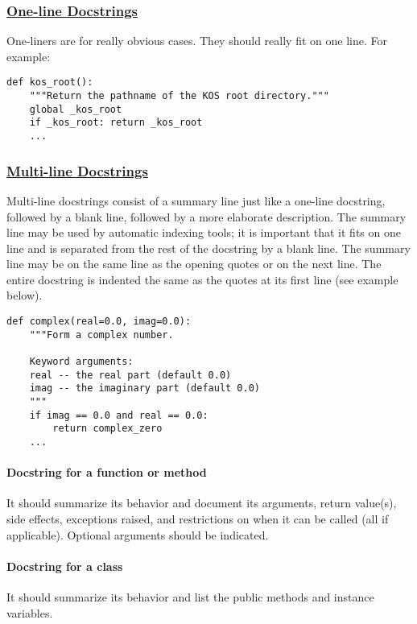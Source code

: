 \documentclass[a4paper]{report}
\begin{document}
\subsubsection{\href{https://www.python.org/dev/peps/pep-0257/\#one-line-docstrings}{One-line Docstrings}}
One-liners are for really obvious cases. They should really fit on one line. For example: 
\begin{verbatim}
def kos_root():
    """Return the pathname of the KOS root directory."""
    global _kos_root
    if _kos_root: return _kos_root
    ...
\end{verbatim}
\subsubsection{\href{https://www.python.org/dev/peps/pep-0257/\#multi-line-docstrings}{Multi-line Docstrings}}
Multi-line docstrings consist of a summary line just like a one-line docstring, followed by a blank line, followed by a more elaborate description. The summary line may be used by automatic indexing tools; it is important that it fits on one line and is separated from the rest of the docstring by a blank line. The summary line may be on the same line as the opening quotes or on the next line. The entire docstring is indented the same as the quotes at its first line (see example below).
\begin{verbatim}
def complex(real=0.0, imag=0.0):
    """Form a complex number.

    Keyword arguments:
    real -- the real part (default 0.0)
    imag -- the imaginary part (default 0.0)
    """
    if imag == 0.0 and real == 0.0:
        return complex_zero
    ...
\end{verbatim}

\paragraph{Docstring for a function or method} It should summarize its behavior and document its arguments, return value(s), side effects, exceptions raised, and restrictions on when it can be called (all if applicable). Optional arguments should be indicated.

\paragraph{Docstring for a class} It should summarize its behavior and list the public methods and instance variables.
\end{document}
